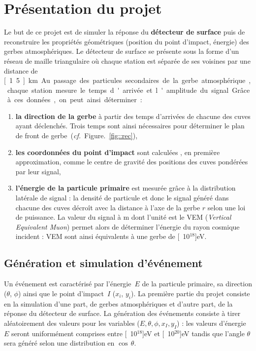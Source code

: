 \documentclass[10pt,a4paper,twoside]{report}
\newcommand{\fig}[1]{Figure.~\ref{#1}}
\begin{document}
\section{Présentation du projet}

Le but de ce projet est de simuler la réponse du \textbf{détecteur de
  surface} puis de reconstruire les propriétés géométriques (position
du point d'impact, énergie) des gerbes atmosphériques. Le détecteur de
surface se présente sous la forme d'un réseau de maille triangulaire
où chaque station est séparée de ses voisines par une distance de
\unit[1.5]{km}. Au passage des particules secondaires de la gerbe
atmosphérique, chaque station mesure le temps d'arrivée et l'amplitude
du signal. Grâce à ces données, on peut ainsi déterminer :

\begin{enumerate}

\item[\textbullet] \textbf{la direction de la gerbe} à partir des
  temps d'arrivées de chacune des cuves ayant déclenchés. Trois temps
  sont ainsi nécessaires pour déterminer le plan de front de
  gerbe~(\emph{cf.}~\fig{fig::rec}),

\item[\textbullet] \textbf{les coordonnées du point d'impact} sont
  calculées , en première approximation, comme le centre de gravité
  des positions des cuves pondérées par leur signal,

\item[\textbullet] \textbf{l'énergie de la particule primaire} est
  mesurée grâce à la distribution latérale de signal : la densité de
  particule et donc le signal généré dans chacune des cuves décroît
  avec la distance à l'axe de la gerbe $r$ selon une loi de
  puissance. La valeur du signal à \unit[1000]{m} dont l'unité est le
  VEM (\emph{Vertical Equivalent Muon}) permet alors de déterminer
  l'énergie du rayon cosmique incident : \unit[8]{VEM} sont ainsi
  équivalents à une gerbe de \unit[10$^\text{18}$]{eV}.

\end{enumerate}

\subsection{Génération et simulation d'événement}

Un événement est caractérisé par l'énergie~$E$ de la particule
primaire, sa direction ($\theta$, $\phi$) ainsi que le point d'impact~$I$
($x_i$, $y_i$). La première partie du projet consiste en la simulation
d'une part, de gerbes atmosphériques et d'autre part, de la réponse du
détecteur de surface. La génération des événements consiste à tirer
aléatoirement des valeurs pour les variables ($E, \theta, \phi, x_I,
y_I$) : les valeurs d'énergie $E$ seront uniformément comprises entre
\unit[10$^\text{18}$]{eV} et \unit[10$^\text{20}$]{eV} tandis que
l'angle $\theta$ sera généré selon une distribution en $\cos\,\theta$.
\end{document}
